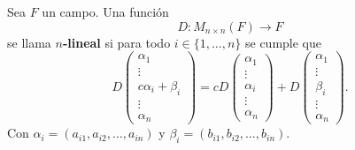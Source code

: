 \documentclass[12pt,a4paper]{book}
\newcommand{\llaves}[1]{\{#1\}}
\newcommand{\parentesis}[1]{\left(#1\right)}
\begin{document}
    \begin{definicion}
    \label{def:32}
        Sea $F$ un campo. Una función
        \begin{equation*}
        D:M_{n \times n}(F) \longrightarrow F
        \end{equation*}
        se llama \textbf{$n$-lineal} si para todo $i \in \llaves{1, \dots, n}$ se cumple que
        \begin{equation*}
        D
        \begin{pmatrix}
            \alpha_{1}\\
            \vdots\\
            c \alpha_{i} + \beta_{i}\\
            \vdots\\
            \alpha_{n}
        \end{pmatrix} = 
        cD
        \begin{pmatrix}
            \alpha_{1}\\
            \vdots\\
            \alpha_{i}\\
            \vdots\\
            \alpha_{n}
        \end{pmatrix} + D
        \begin{pmatrix}
            \alpha_{1}\\
            \vdots\\
            \beta_{i}\\
            \vdots\\
            \alpha_{n}
        \end{pmatrix}.
        \end{equation*}
        Con $\alpha_{i} = \parentesis{a_{i1}, a_{i2}, \dots , a_{in}}$ y $\beta_{i} = \parentesis{b_{i1}, b_{i2}, \dots , b_{in}}$.
    \end{definicion}
\end{document}
